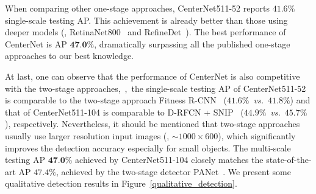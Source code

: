 \documentclass[10pt,twocolumn,letterpaper]{article}
\begin{document}
When comparing other one-stage approaches, CenterNet511-52 reports $41.6\%$ single-scale testing AP. This achievement is already better than those using deeper models (\eg, RetinaNet800~\cite{lin2017focal} and RefineDet~\cite{zhang2018single}). The best performance of CenterNet is AP $\textbf{47.0\%}$, dramatically surpassing all the published one-stage approaches to our best knowledge.

At last, one can observe that the performance of CenterNet is also competitive with the two-stage approaches,~\eg,~the single-scale testing AP of CenterNet511-52 is comparable to the two-stage approach Fitness R-CNN~\cite{tychsen2018improving} ($41.6\%$~\emph{vs.}~$41.8\%$) and that of CenterNet511-104 is comparable to D-RFCN + SNIP~\cite{singh2018analysis} ($44.9\%$~\emph{vs.}~$45.7\%$), respectively. Nevertheless, it should be mentioned that two-stage approaches usually use larger resolution input images (\eg, $\sim1000\times600$), which significantly improves the detection accuracy especially for small objects. 
The multi-scale testing AP $\textbf{47.0\%}$ achieved by CenterNet511-104 closely matches the state-of-the-art AP $47.4\%$, achieved by the two-stage detector PANet~\cite{liu2018path}. We present some qualitative detection results in Figure~\ref{qualitative_detection}.
\end{document}
